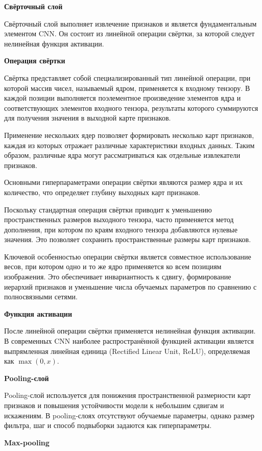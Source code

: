 \textbf{Свёрточный слой}


Свёрточный слой выполняет извлечение признаков и является фундаментальным элементом CNN. Он состоит из линейной операции свёртки, за которой следует нелинейная функция активации.

\textbf{Операция свёртки}


Свёртка представляет собой специализированный тип линейной операции, при которой массив чисел, называемый ядром, применяется к входному тензору. В каждой позиции выполняется поэлементное произведение элементов ядра и соответствующих элементов входного тензора, результаты которого суммируются для получения значения в выходной карте признаков.

Применение нескольких ядер позволяет формировать несколько карт признаков, каждая из которых отражает различные характеристики входных данных. Таким образом, различные ядра могут рассматриваться как отдельные извлекатели признаков.

Основными гиперпараметрами операции свёртки являются размер ядра и их количество, что определяет глубину выходных карт признаков.

Поскольку стандартная операция свёртки приводит к уменьшению пространственных размеров выходного тензора, часто применяется метод дополнения, при котором по краям входного тензора добавляются нулевые значения. Это позволяет сохранить пространственные размеры карт признаков.

Ключевой особенностью операции свёртки является совместное использование весов, при котором одно и то же ядро применяется ко всем позициям изображения. Это обеспечивает инвариантность к сдвигу, формирование иерархий признаков и уменьшение числа обучаемых параметров по сравнению с полносвязными сетями.

\textbf{Функция активации}


После линейной операции свёртки применяется нелинейная функция активации. В современных CNN наиболее распространённой функцией активации является выпрямленная линейная единица (Rectified Linear Unit, ReLU), определяемая как $\max(0, x)$.

\textbf{Pooling-слой}


Pooling-слой используется для понижения пространственной размерности карт признаков и повышения устойчивости модели к небольшим сдвигам и искажениям. В pooling-слоях отсутствуют обучаемые параметры, однако размер фильтра, шаг и способ подвыборки задаются как гиперпараметры.

\textbf{Max-pooling}


